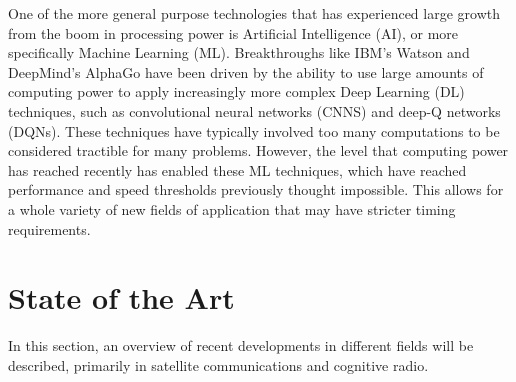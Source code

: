 \par One of the more general purpose technologies that has experienced large growth from the boom in processing power is Artificial Intelligence (AI), or more specifically Machine Learning (ML). Breakthroughs like IBM's Watson and DeepMind's AlphaGo have been driven by the ability to use large amounts of computing power to apply increasingly more complex Deep Learning (DL) techniques, such as convolutional neural networks (CNNS) and deep-Q networks (DQNs)\cite{paulo5}. These techniques have typically involved too many computations to be considered tractible for many problems. However, the level that computing power has reached recently has enabled these ML techniques, which have reached performance and speed thresholds previously thought impossible. This allows for a whole variety of new fields of application that may have stricter timing requirements. 


\section{State of the Art}
\par In this section, an overview of recent developments in different fields will be described, primarily in satellite communications and cognitive radio. 
